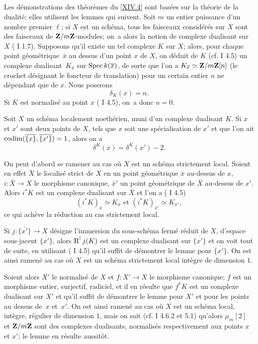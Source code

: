 \subsection{} \label{XIV.2.3}
Les d\'emonstrations des th\'eor\`emes du \numero \ref{XIV.4} sont bas\'ees sur la th\'eorie de la dualit\'e; elles utilisent les lemmes qui suivent. Soit $m$ un entier puissance d'un nombre premier $\ell$; si $X$ est un sch\'ema, tous les faisceaux consid\'er\'es sur $X$ sont des faisceaux de $\mathbf{Z}/m\mathbf{Z}$-modules; on~a alors la notion de complexe dualisant sur $X$ ( I 1.7). Supposons qu'il existe un tel complexe $K$ sur $X$; alors, pour chaque point g\'eom\'etrique~$\bar x$ au dessus d'un point $x$ de $X$, on d\'eduit de $K$ (cf.  I 4.5) un complexe dualisant~$K_{\bar x}$ sur $\operatorname{Spec} k(\overline x)$, de sorte que l'on a $K_{\overline x}\simeq\mathbf{Z}/m\mathbf{Z}[n]$ (le crochet d\'esignant le foncteur de translation) pour un certain entier $n$ ne d\'ependant que de $x$. Nous poserons
$$
\delta_K(x)=n.
$$
Si $K$ est normalis\'e au point $x$ ( I 4.5), on~a donc $n=0$.

\begin{sublemme} \label{XIV.2.3.1} Soit $X$ un sch\'ema localement noeth\'erien, muni d'un complexe dualisant $K$. Si $x$ et $x'$ sont deux points de $X$, tels que $x$ soit une sp\'ecialisation de $x'$ et que l'on ait $\operatorname{codim}(\overline{\{x\}}, \overline{\{x'\}})=1$, alors on a
$$
\delta^K(x)=\delta^{K}(x')-2.
$$
\end{sublemme}

On peut d'abord se ramener au cas o\`u $X$ est un sch\'ema strictement local. Soient en effet $\bar X$ le localis\'e strict de $X$ en un point g\'eom\'etrique $\bar x$ au-dessus de $x$, $i:\bar X\to X$ le morphisme canonique, $\bar x'$ un point g\'eom\'etrique de $\bar X$ au-dessus de $x'$. Alors $i^*K$ est un complexe dualisant sur $\bar X$ et l'on a ( I 4.5)
$$
(i^*K)_{\bar x}\simeq K_{\bar x}\text{ et } (i^*K)_{\bar x'}\simeq K_{\bar x'},
$$
ce qui ach\`eve la r\'eduction au cas strictement local.

Si $j:\overline{\{x'\}}\to X$ d\'esigne l'immersion du sous-sch\'ema ferm\'e r\'eduit de $X$, d'espace sous-jacent $\overline{\{x'\}}$, alors $\operatorname{R}^!j(K)$ est un complexe dualisant sur $\overline{\{x'\}}$ et on voit tout de suite, en utilisant ( I 4.5) qu'il suffit de d\'emontrer le lemme pour $\overline{\{x'\}}$. On est ainsi ramen\'e au cas o\`u $X$ est un sch\'ema strictement local int\`egre de dimension $1$.

Soient alors $X'$ le normalis\'e de $X$ et $f:X'\to X$ le morphisme canonique; $f$ est un morphisme entier, surjectif, radiciel, et il en r\'esulte que $f^*K$ est un complexe dualisant sur $X'$ et qu'il suffit de d\'emontrer le lemme pour $X'$ et pour les points au dessus de~$x$ et~$x'$. On est ainsi ramen\'e au cas o\`u $X$ est un sch\'ema local, int\`egre, r\'egulier de dimension $1$, mais on sait (cf.  I 4.6.2 et 5.1) qu'alors $\mu_m[2]$ et $\mathbf{Z}/m\mathbf{Z}$ sont des complexes dualisants, normalis\'es respectivement aux points $x$ et $x'$; le lemme en r\'esulte aussit\^{o}t.


